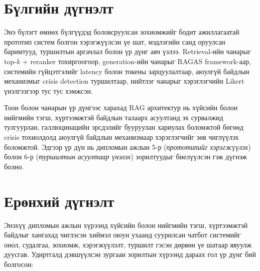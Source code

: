 
\section{Бүлгийн дүгнэлт}

Энэ бүлэгт өмнөх бүлгүүдэд боловсруулсан зохиомжийг бодит ажиллагаатай прототип систем болгон хэрэгжүүлсэн үе шат, мэдлэгийн санд оруулсан баримтууд, туршилтын аргачлал болон үр дүнг авч үзлээ. Retrieval-ийн чанарыг top-$k$ + reranker тохиргоогоор, generation-ийн чанарыг RAGAS framework-аар, системийн гүйцэтгэлийг latency болон токены зарцуулалтаар, аюулгүй байдлын механизмыг crisis detection туршилтаар, нийтлэг чанарыг хэрэглэгчийн Likert үнэлгээгээр тус тус хэмжсэн.

Тоон болон чанарын үр дүнгээс харахад RAG архитектур нь хүйсийн болон нийгмийн тэгш, хүртээмжтэй байдлын талаарх асуултанд эх сурвалжид тулгуурлан, галлюцинацийн эрсдэлийг бууруулан хариулах боломжтой бөгөөд crisis тохиолдолд аюулгүй байдлын механизмаар хэрэглэгчийг зөв чиглүүлэх боломжтой. Эдгээр үр дүн нь дипломын ажлын 5-р (\textit{прототипийг хэрэгжүүлэх}) болон 6-р (\textit{туршилтын асуултаар үнэлэх}) зорилтуудыг биелүүлсэн гэж дүгнэж болно.


\section{Ерөнхий дүгнэлт}

Энэхүү дипломын ажлын хүрээнд хүйсийн болон нийгмийн тэгш, хүртээмжтэй байдлыг хангахад чиглэсэн хиймэл оюун ухаанд суурилсан чатбот системийг онол, судалгаа, зохиомж, хэрэгжүүлэлт, туршилт гэсэн дөрвөн үе шатаар явуулж дуусгав. Удиртгалд дэвшүүлсэн зургаан зорилтын хүрээнд дараах гол үр дүнг бий болгосон:

